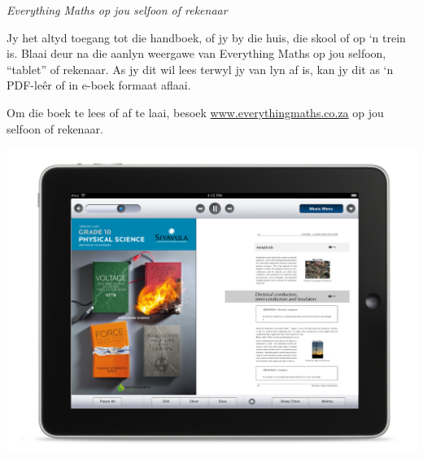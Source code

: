 \newpage
\thispagestyle{empty}

{\normalfont\sffamily\fontsize{22}\normalfont\itshape Everything Maths op jou selfoon of rekenaar} \par

{
Jy het altyd toegang tot die handboek, of jy by die huis, die skool of op ‘n trein is. Blaai deur na die aanlyn weergawe van Everything Maths op jou selfoon, “tablet” of rekenaar. As jy dit wil lees terwyl jy van lyn af is, kan jy dit as ‘n PDF-leêr of in e-boek formaat aflaai.\par


Om die boek te lees of af te laai, besoek \underline{www.everythingmaths.co.za} op jou selfoon of rekenaar.} \vspace*{1cm}

\begin{center}
\begin{minipage}{0.6\textwidth}
\centering
\includegraphics[width=1\textwidth]{title_images/ipad.jpg}
\end{minipage}
\begin{minipage}{0.3\textwidth}
\centering

\end{minipage}
\end{center}
